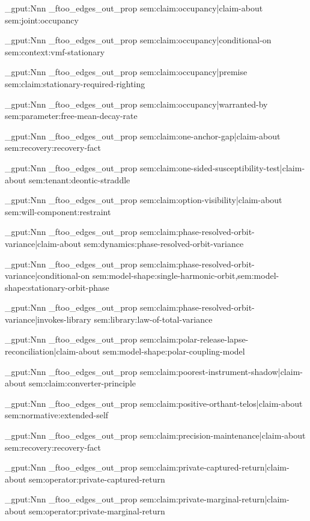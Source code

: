 \prop_gput:Nnn \g_ftoo_edges_out_prop { sem:claim:occupancy|claim-about } { sem:joint:occupancy }

\prop_gput:Nnn \g_ftoo_edges_out_prop { sem:claim:occupancy|conditional-on } { sem:context:vmf-stationary }

\prop_gput:Nnn \g_ftoo_edges_out_prop { sem:claim:occupancy|premise } { sem:claim:stationary-required-righting }

\prop_gput:Nnn \g_ftoo_edges_out_prop { sem:claim:occupancy|warranted-by } { sem:parameter:free-mean-decay-rate }

\prop_gput:Nnn \g_ftoo_edges_out_prop { sem:claim:one-anchor-gap|claim-about } { sem:recovery:recovery-fact }

\prop_gput:Nnn \g_ftoo_edges_out_prop { sem:claim:one-sided-susceptibility-test|claim-about } { sem:tenant:deontic-straddle }

\prop_gput:Nnn \g_ftoo_edges_out_prop { sem:claim:option-visibility|claim-about } { sem:will-component:restraint }

\prop_gput:Nnn \g_ftoo_edges_out_prop { sem:claim:phase-resolved-orbit-variance|claim-about } { sem:dynamics:phase-resolved-orbit-variance }

\prop_gput:Nnn \g_ftoo_edges_out_prop { sem:claim:phase-resolved-orbit-variance|conditional-on } { sem:model-shape:single-harmonic-orbit,sem:model-shape:stationary-orbit-phase }

\prop_gput:Nnn \g_ftoo_edges_out_prop { sem:claim:phase-resolved-orbit-variance|invokes-library } { sem:library:law-of-total-variance }

\prop_gput:Nnn \g_ftoo_edges_out_prop { sem:claim:polar-release-lapse-reconciliation|claim-about } { sem:model-shape:polar-coupling-model }

\prop_gput:Nnn \g_ftoo_edges_out_prop { sem:claim:poorest-instrument-shadow|claim-about } { sem:claim:converter-principle }

\prop_gput:Nnn \g_ftoo_edges_out_prop { sem:claim:positive-orthant-telos|claim-about } { sem:normative:extended-self }

\prop_gput:Nnn \g_ftoo_edges_out_prop { sem:claim:precision-maintenance|claim-about } { sem:recovery:recovery-fact }

\prop_gput:Nnn \g_ftoo_edges_out_prop { sem:claim:private-captured-return|claim-about } { sem:operator:private-captured-return }

\prop_gput:Nnn \g_ftoo_edges_out_prop { sem:claim:private-marginal-return|claim-about } { sem:operator:private-marginal-return }

